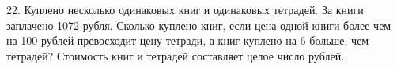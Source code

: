 22. Куплено несколько одинаковых книг и одинаковых тетрадей. За книги заплачено 1072 рубля. Сколько куплено книг, если цена одной книги более чем на 100 рублей превосходит цену тетради, а книг куплено на 6 больше, чем тетрадей? Стоимость книг и тетрадей составляет целое число рублей.\\
